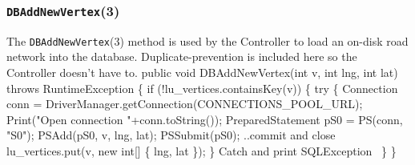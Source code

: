 \documentclass{article}
\def\nwendcode{\endtrivlist \endgroup}      %
\let\nwdocspar=\par
\theoremstyle{definition}                   %
\begin{document}
\subsubsection{{\tt{}\protect{}DBAddNewVertex}(3)}
The {\tt{}\protect{}DBAddNewVertex}(3) method is used by the Controller to load an on-disk
road network into the database. Duplicate-prevention is included here so the
Controller doesn't have to.
\nwenddocs{}\endmoddef{}
public void DBAddNewVertex(int v, int lng, int lat) throws RuntimeException \{
  if (!lu_vertices.containsKey(v)) \{
    try \{
      Connection conn = DriverManager.getConnection(CONNECTIONS_POOL_URL);
      Print("Open connection "+conn.toString());
      PreparedStatement pS0 = PS(conn, "S0");
      PSAdd(pS0, v, lng, lat);
      PSSubmit(pS0);
      \LA{}..commit and close~{\nwtagstyle{}}\RA{}
      lu_vertices.put(v, new int[] \{ lng, lat \});
    \}
    \LA{}Catch and print \code{}SQLException\edoc{}~{\nwtagstyle{}}\RA{}
  \}
\}
\eatline
{}\nwendcode{}\nwdocspar
\end{document}
